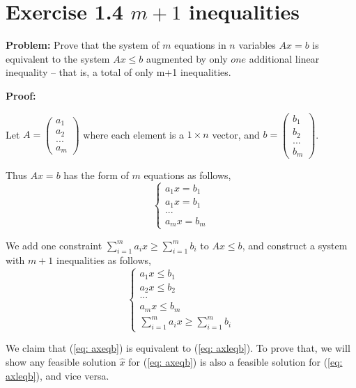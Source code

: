 \section{Exercise 1.4 $m+1$ inequalities}
\textbf{Problem:} Prove that the system of $m$ equations in $n$ variables $Ax=b$ is equivalent to the system $Ax\leq b$ augmented by only $one$ additional linear inequality -- that is, a total of only m+1 inequalities.

\textbf{Proof:}

Let $A=\left( \begin{array}{c} a_{1} \\ a_{2} \\ ... \\ a_{m} \end{array}\right) $ where each element is a $1\times n$ vector, and $b=\left( \begin{array}{c} b_{1} \\ b_{2} \\ ... \\ b_{m}  \end{array} \right) $. 

Thus $Ax=b$ has the form of $m$ equations as follows,
\begin{equation}
\label{eq: axeqb}
 \left\{ \begin{array}{c}
a_{1}x=b_{1} \\
a_{1}x=b_{1} \\
...\\
a_{m}x=b_{m}
\end{array} \right.
\end{equation}

We add one constraint $\sum\limits_{i=1}^m a_{i}x \geq \sum\limits_{i=1}^m b_{i}$ to $Ax\leq b$, and construct a system with $m+1$ inequalities as follows,
\begin{equation}
\label{eq: axleqb}
 \left\{ \begin{array}{c}
a_{1}x\leq b_{1} \\
a_{2}x\leq b_{2} \\
...\\
a_{m}x \leq b_{m}\\
\sum\limits_{i=1}^m a_{i}x \geq \sum\limits_{i=1}^m b_{i}
\end{array} \right.
\end{equation}
 
We claim that (\ref{eq: axeqb}) is equivalent to (\ref{eq: axleqb}). To prove that, we will show any feasible solution $\widehat{x}$ for (\ref{eq: axeqb}) is also a feasible solution for (\ref{eq: axleqb}), and vice versa.

